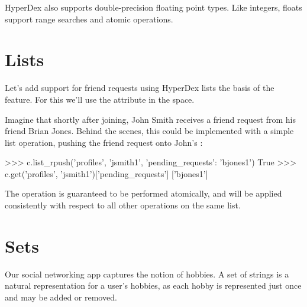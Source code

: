 HyperDex also supports double-precision floating point types.  Like integers,
floats support range searches and atomic operations.

\section{Lists}

Let's add support for friend requests using HyperDex lists the basis of the
feature.  For this we'll use the  attribute in the
 space.
 
Imagine that shortly after joining, John Smith receives a friend request from
his friend Brian Jones.  Behind the scenes, this could be implemented with a
simple list operation, pushing the friend request onto John's
:

\begin{pythoncode}
>>> c.list_rpush('profiles', 'jsmith1', {'pending_requests': 'bjones1'})
True
>>> c.get('profiles', 'jsmith1')['pending_requests']
['bjones1']
\end{pythoncode}

The operation  is guaranteed to be performed atomically, and
will be applied consistently with respect to all other operations on the same
list.

\begin{comment} %
Note that lists provide both an lpush and rpush operation. The former adds the
new element at the head of the list, while the latter adds at the tail. They
also provide lpop operation for taking an element off the head of the list.
Coupled together, these operations provide a comprehensive list datatype that
can be used to implement fault-tolerant lists of all kinds. For instnace, one
can implement work queues and generalized producer-consumer patterns on top of
HyperDex lists in a pretty straightforward fashion. In this case, producers
would push at one end of the list (the tail, with an rpush) and consumers would
pop from the other (the head, with a pop). Since the operations are atomic, no
additional synchronization would be necessary, enabling a high-performance
implementation.
\end{comment}

\section{Sets}

Our social networking app captures the notion of hobbies.  A set of strings is a
natural representation for a user's hobbies, as each hobby is represented just
once and may be added or removed.

